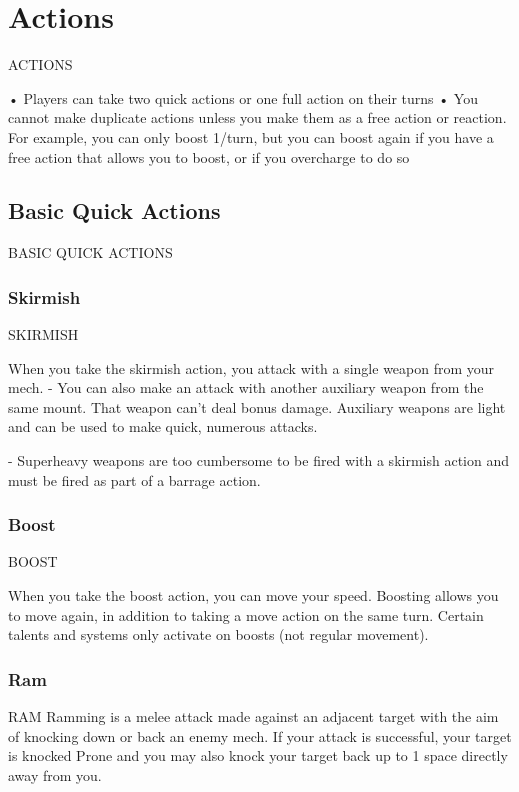 \section{Actions}
 ACTIONS

•   Players can take two quick actions or one full action on their turns
•   You cannot make duplicate actions unless you make them as a free action or reaction. For
    example, you can only boost 1/turn, but you can boost again if you have a free action that
    allows you to boost, or if you overcharge to do so

\subsection{Basic Quick Actions}

                       BASIC QUICK ACTIONS
\subsubsection{Skirmish}

                                             SKIRMISH

When you take the skirmish action, you attack with a single weapon from your mech.
        - You can also make an attack with another auxiliary weapon from the same mount. That
        weapon can’t deal bonus damage. Auxiliary weapons are light and can be used to make
        quick, numerous attacks.

        	- Superheavy weapons are too cumbersome to be fired with a skirmish action and must
        be fired as part of a barrage action.

\subsubsection{Boost}

                                                BOOST

When you take the boost action, you can move your speed. Boosting allows you to move again,
in addition to taking a move action on the same turn. Certain talents and systems only activate
on boosts (not regular movement).

\subsubsection{Ram}

                                                 RAM
Ramming is a melee attack made against an adjacent target with the aim of knocking down or
back an enemy mech.
If your attack is successful, your target is knocked Prone and you may also knock your target
back up to 1 space directly away from you.

